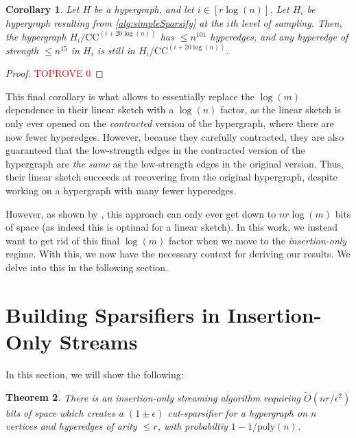\documentclass[11pt]{article}
\newtheorem{theorem}{Theorem}[section]
\newtheorem{corollary}[theorem]{Corollary}
\theoremstyle{definition}
\newcommand{\eps}{\epsilon}
\begin{document}
\begin{corollary}\label{cor:boundedHyperedges}
	Let $H$ be a hypergraph, and let $i \in [r \log(n)]$. Let $H_i$ be hypergraph resulting from \cref{alg:simpleSparsify} at the $i$th level of sampling. Then, the hypergraph $H_i /  \mathrm{CC}^{(i + 20 \log(n))}$ has $\leq n^{101}$ hyperedges, and any hyperedge of strength $\leq n^{15}$ in $H_i$ is still in $H_i /  \mathrm{CC}^{(i + 20 \log(n))}$.
\end{corollary}

\begin{proof}\textcolor{red}{TOPROVE 0}\end{proof}

This final corollary is what allows \cite{KPS24d} to essentially replace the $\log(m)$ dependence in their linear sketch with a $\log(n)$ factor, as the linear sketch is only ever opened on the \emph{contracted} version of the hypergraph, where there are now fewer hyperedges. However, because they carefully contracted, they are also guaranteed that the low-strength edges in the contracted version of the hypergraph are \emph{the same} as the low-strength edges in the original version. Thus, their linear sketch succeeds at recovering from the original hypergraph, despite working on a hypergraph with many fewer hyperedges.

However, as shown by \cite{KPS24d}, this approach can only ever get down to $nr \log(m)$ bits of space (as indeed this is optimal for a linear sketch).
In this work, we instead want to get rid of this final $\log(m)$ factor when we move to the \emph{insertion-only} regime. With this, we now have the necessary context for deriving our results. We delve into this in the following section.
	
\section{Building Sparsifiers in Insertion-Only Streams}\label{sec:insertion}


In this section, we will show the following:

\begin{theorem}\label{thm:insertionOnly}
	There is an insertion-only streaming algorithm requiring $\widetilde{O}(n r / \eps^2)$ bits of space which creates a $(1 \pm \eps)$ cut-sparsifier for a hypergraph on $n$ vertices and hyperedges of arity $\leq r$, with probabiltiy $1 - 1 / \mathrm{poly}(n)$.
\end{theorem}
\end{document}
